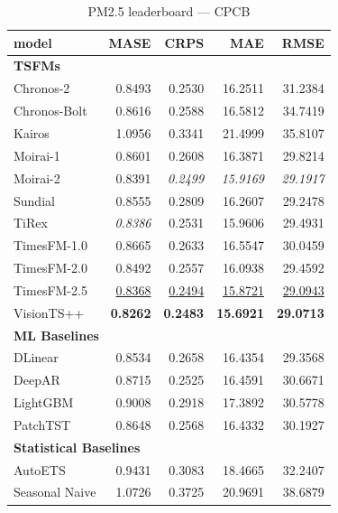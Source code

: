 \begin{table}[H]
\caption{PM2.5 leaderboard --- CPCB}
\centering
\begin{small}
\begin{tabular}{lrrrr}
\toprule
model & MASE & CRPS & MAE & RMSE \\
\midrule
\multicolumn{5}{l}{\textbf{TSFMs}} \\
Chronos-2 & 0.8493 & 0.2530 & 16.2511 & 31.2384 \\
Chronos-Bolt & 0.8616 & 0.2588 & 16.5812 & 34.7419 \\
Kairos & 1.0956 & 0.3341 & 21.4999 & 35.8107 \\
Moirai-1 & 0.8601 & 0.2608 & 16.3871 & 29.8214 \\
Moirai-2 & 0.8391 & \textit{0.2499} & \textit{15.9169} & \textit{29.1917} \\
Sundial & 0.8555 & 0.2809 & 16.2607 & 29.2478 \\
TiRex & \textit{0.8386} & 0.2531 & 15.9606 & 29.4931 \\
TimesFM-1.0 & 0.8665 & 0.2633 & 16.5547 & 30.0459 \\
TimesFM-2.0 & 0.8492 & 0.2557 & 16.0938 & 29.4592 \\
TimesFM-2.5 & \underline{0.8368} & \underline{0.2494} & \underline{15.8721} & \underline{29.0943} \\
VisionTS++ & \textbf{0.8262} & \textbf{0.2483} & \textbf{15.6921} & \textbf{29.0713} \\
\midrule
\multicolumn{5}{l}{\textbf{ML Baselines}} \\
DLinear & 0.8534 & 0.2658 & 16.4354 & 29.3568 \\
DeepAR & 0.8715 & 0.2525 & 16.4591 & 30.6671 \\
LightGBM & 0.9008 & 0.2918 & 17.3892 & 30.5778 \\
PatchTST & 0.8648 & 0.2568 & 16.4332 & 30.1927 \\
\midrule
\multicolumn{5}{l}{\textbf{Statistical Baselines}} \\
AutoETS & 0.9431 & 0.3083 & 18.4665 & 32.2407 \\
Seasonal Naive & 1.0726 & 0.3725 & 20.9691 & 38.6879 \\
\bottomrule
\end{tabular}
\end{small}
\end{table}
